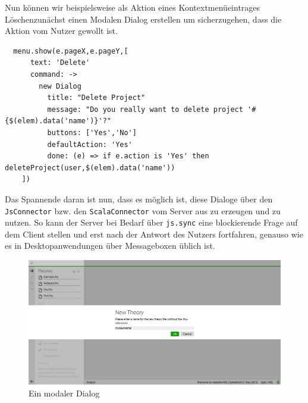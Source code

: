 Nun können wir beispielsweise als Aktion eines Kontextmenüeintrages \glqq Löschen\grqq zunächst
einen Modalen Dialog erstellen um sicherzugehen, dass die Aktion vom Nutzer gewollt ist.

\begin{lstlisting}
  menu.show(e.pageX,e.pageY,[
      text: 'Delete'
      command: ->
        new Dialog
          title: "Delete Project"
          message: "Do you really want to delete project '#{$(elem).data('name')}'?"
          buttons: ['Yes','No']
          defaultAction: 'Yes'
          done: (e) => if e.action is 'Yes' then deleteProject(user,$(elem).data('name'))                  
    ])
\end{lstlisting}

Das Spannende daran ist nun, dass es möglich ist, diese Dialoge über den \texttt{JsConnector} bzw.
den \texttt{ScalaConnector} vom Server aus zu erzeugen und zu nutzen. So kann der Server bei Bedarf
über \texttt{js.sync} eine blockierende Frage auf dem Client stellen und erst nach der Antwort des
Nutzers fortfahren, genauso wie es in Desktopanwendungen über Messageboxen üblich ist.

\begin{figure}[ht]
\centering
\includegraphics[width=\linewidth]{images/screen-dialog}
  \caption{Ein modaler Dialog}
  \label{fig:dialog}
\end{figure}
